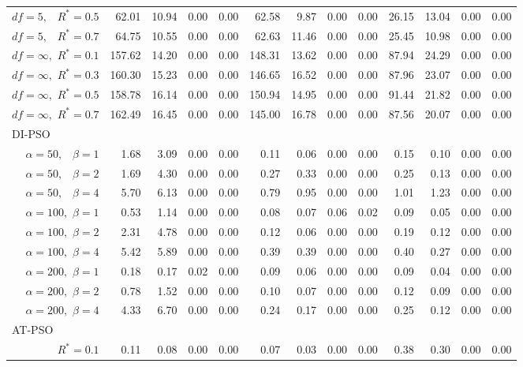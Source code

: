 \documentclass[12pt]{article}
\begin{document}
\begin{table}[ht]
{\begin{tabular}{r|rrrr|rrrr|rrrr}
  $df = 5,\enspace$ $R^* =0.5$ & 62.01 & 10.94 & 0.00 & 0.00 & 62.58 & 9.87 & 0.00 & 0.00 & 26.15 & 13.04 & 0.00 & 0.00 \\ 
  $df = 5,\enspace$ $R^* =0.7$ & 64.75 & 10.55 & 0.00 & 0.00 & 62.63 & 11.46 & 0.00 & 0.00 & 25.45 & 10.98 & 0.00 & 0.00 \\ 
  $df = \infty,$ $R^* =0.1$ & 157.62 & 14.20 & 0.00 & 0.00 & 148.31 & 13.62 & 0.00 & 0.00 & 87.94 & 24.29 & 0.00 & 0.00 \\ 
  $df = \infty,$ $R^* =0.3$ & 160.30 & 15.23 & 0.00 & 0.00 & 146.65 & 16.52 & 0.00 & 0.00 & 87.96 & 23.07 & 0.00 & 0.00 \\ 
  $df = \infty,$ $R^* =0.5$ & 158.78 & 16.14 & 0.00 & 0.00 & 150.94 & 14.95 & 0.00 & 0.00 & 91.44 & 21.82 & 0.00 & 0.00 \\ 
  $df = \infty,$ $R^* =0.7$ & 162.49 & 16.45 & 0.00 & 0.00 & 145.00 & 16.78 & 0.00 & 0.00 & 87.56 & 20.07 & 0.00 & 0.00 \\ 
\hline
\multicolumn{1}{l|}{DI-PSO} &&&&&&&&&&&&\\
  $\alpha = 50,\enspace$ $\beta =1$ & 1.68 & 3.09 & 0.00 & 0.00 & 0.11 & 0.06 & 0.00 & 0.00 & 0.15 & 0.10 & 0.00 & 0.00 \\ 
  $\alpha = 50,\enspace$ $\beta =2$ & 1.69 & 4.30 & 0.00 & 0.00 & 0.27 & 0.33 & 0.00 & 0.00 & 0.25 & 0.13 & 0.00 & 0.00 \\ 
  $\alpha = 50,\enspace$ $\beta =4$ & 5.70 & 6.13 & 0.00 & 0.00 & 0.79 & 0.95 & 0.00 & 0.00 & 1.01 & 1.23 & 0.00 & 0.00 \\ 
  $\alpha = 100,$ $\beta =1$ & 0.53 & 1.14 & 0.00 & 0.00 & 0.08 & 0.07 & 0.06 & 0.02 & 0.09 & 0.05 & 0.00 & 0.00 \\ 
  $\alpha = 100,$ $\beta =2$ & 2.31 & 4.78 & 0.00 & 0.00 & 0.12 & 0.06 & 0.00 & 0.00 & 0.19 & 0.12 & 0.00 & 0.00 \\ 
  $\alpha = 100,$ $\beta =4$ & 5.42 & 5.89 & 0.00 & 0.00 & 0.39 & 0.39 & 0.00 & 0.00 & 0.40 & 0.27 & 0.00 & 0.00 \\ 
  $\alpha = 200,$ $\beta =1$ & 0.18 & 0.17 & 0.02 & 0.00 & 0.09 & 0.06 & 0.00 & 0.00 & 0.09 & 0.04 & 0.00 & 0.00 \\ 
  $\alpha = 200,$ $\beta =2$ & 0.78 & 1.52 & 0.00 & 0.00 & 0.10 & 0.07 & 0.00 & 0.00 & 0.12 & 0.09 & 0.00 & 0.00 \\ 
  $\alpha = 200,$ $\beta =4$ & 4.33 & 6.70 & 0.00 & 0.00 & 0.24 & 0.17 & 0.00 & 0.00 & 0.25 & 0.12 & 0.00 & 0.00 \\ 
\hline
\multicolumn{1}{l|}{AT-PSO} &&&&&&&&&&&&\\
  $R^* = 0.1$ & 0.11 & 0.08 & 0.00 & 0.00 & 0.07 & 0.03 & 0.00 & 0.00 & 0.38 & 0.30 & 0.00 & 0.00 \\ 

\end{tabular}}
\end{table}
\end{document}
